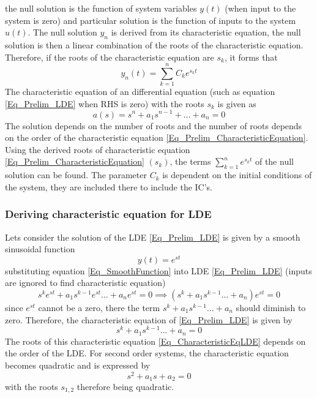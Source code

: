 the null solution is the function of system variables $y(t)$ (when input to the system is zero) and particular solution is the function of inputs to the system $u(t)$. The null solution $y_{n}$ is derived from its characteristic equation, the null solution is then a linear combination of the roots of the characteristic equation. Therefore, if the roots of the characteristic equation are $s_k$, it forms that
\begin{equation} \label{Eq_Prelim_NullSolution}
	y_{n}(t) = \sum_{k = 1}^{n} C_{k} e^{s_{k}t}
\end{equation} 
The characteristic equation of an differential equation (such as equation \eqref{Eq_Prelim_LDE} when RHS is zero) with the roots $s_{k}$ is given as
\begin{equation} \label{Eq_Prelim_CharacteristicEquation}
	a(s) = s^{n} + a_1 s^{n-1} + ... + a_n = 0
\end{equation} 
The solution depends on the number of roots and the number of roots depends on the order of the characteristic equation \eqref{Eq_Prelim_CharacteristicEquation}. Using the derived roots of characteristic equation \ref{Eq_Prelim_CharacteristicEquation} $(s_{k})$, the terms $\sum_{k = 1}^{n} e^{s_{k}t}$ of the null solution can be found. The parameter $C_k$ is dependent on the initial conditions of the system, they are included there to include the IC's.

\subsubsection{Deriving characteristic equation for LDE}

Lets consider the solution of the LDE \ref{Eq_Prelim_LDE} is given by a smooth sinusoidal function 
\begin{equation} \label{Eq_SmoothFunction}
	y(t) = e^{st}
\end{equation}
substituting equation \eqref{Eq_SmoothFunction} into LDE \ref{Eq_Prelim_LDE} (inputs are ignored to find characteristic equation)
\begin{equation} 
	s^{k}e^{st} + a_1 s^{k-1}e^{st} ... + a_n e^{st} = 0 \implies (s^{k} + a_1 s^{k-1} ... + a_n) e^{st} = 0
\end{equation}
since $e^{st}$ cannot be a zero, there the term $s^{k} + a_1 s^{k-1} ... + a_n$ should diminish to zero. Therefore, the characteristic equation of \ref{Eq_Prelim_LDE} is given by
\begin{equation} \label{Eq_CharacteristicEqLDE}
	s^{k} + a_1 s^{k-1} ... + a_n = 0
\end{equation}
The roots of this characteristic equation \eqref{Eq_CharacteristicEqLDE} depends on the order of the LDE. For second order systems, the characteristic equation becomes quadratic and is expressed by
\begin{equation}
	s^{2} + a_{1}s + a_{2} = 0 
\end{equation}
with the roots $s_{1,2}$ therefore being quadratic.

